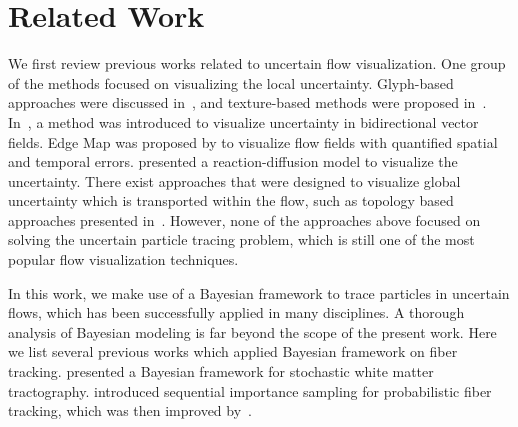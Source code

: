 \section{Related Work}

We first review previous works related to uncertain flow visualization. One group of the methods focused on visualizing the local uncertainty. Glyph-based approaches were discussed in~\cite{conf/visualization/LodhaPSW96, citeulike:4002316}, and texture-based methods were proposed in~\cite{10.1109/VIS.2005.97, botchen:2006:IVUF}. In~\cite{zuk:2008:UBVF}, a method was introduced to visualize uncertainty in bidirectional vector fields. Edge Map was proposed by \cite{10.1109/TVCG.2011.265} to visualize flow fields with quantified spatial and temporal errors. \cite{conf/visualization/SandersonJK04} presented a reaction-diffusion model to visualize the uncertainty. There exist approaches that were designed to visualize global uncertainty which is transported within the flow, such as topology based approaches presented in~\cite{Otto10a, Otto11a}. However, none of the approaches above focused on solving the uncertain particle tracing problem, which is still one of the most popular flow visualization techniques.

In this work, we make use of a Bayesian framework to trace particles in uncertain flows, which has been successfully applied in many disciplines. A thorough analysis of Bayesian modeling is far beyond the scope of the present work. Here we list several previous works which applied Bayesian framework on fiber tracking. \cite{frimanTMI06} presented a Bayesian framework for stochastic white matter tractography. \cite{bjornemoMICCAI02, Brun02whitematter} introduced sequential importance sampling for probabilistic fiber tracking, which was then improved by~\cite{journals/mia/PontabryROSKD13, Zhang20095}.
